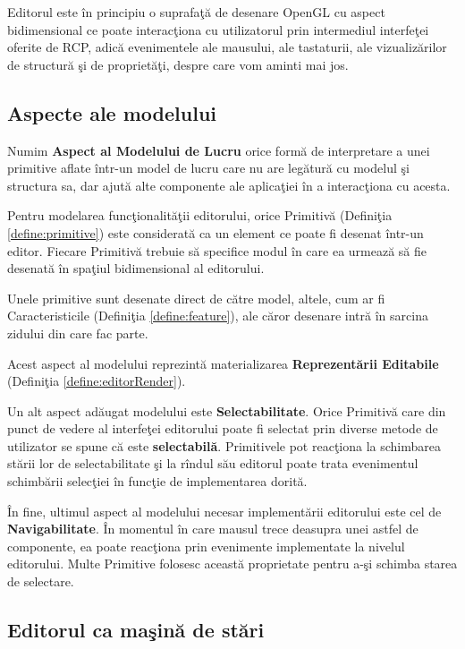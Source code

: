Editorul este în principiu o suprafaţă de desenare OpenGL cu aspect 
bidimensional ce poate interacţiona cu utilizatorul prin intermediul interfeţei 
oferite de RCP, adică evenimentele ale mausului, ale tastaturii, ale 
vizualizărilor de structură şi de proprietăţi, despre care vom aminti mai jos.

\subsection{Aspecte ale modelului}

\begin{definition}
\label{define:model-aspect}
Numim \textbf{Aspect al Modelului de Lucru} orice formă de interpretare a unei
primitive aflate într-un model de lucru care nu are legătură cu modelul şi
structura sa, dar ajută alte componente ale aplicaţiei în a interacţiona cu
acesta.
\end{definition}

Pentru modelarea funcţionalităţii editorului, orice Primitivă (Definiţia 
\ref{define:primitive}) este considerată ca un element ce poate fi desenat 
într-un editor. Fiecare Primitivă trebuie să specifice modul în care ea urmează 
să fie desenată în spaţiul bidimensional al editorului.

Unele primitive sunt desenate direct de către model, altele, cum ar fi 
Caracteristicile (Definiţia \ref{define:feature}), ale căror desenare intră în 
sarcina zidului din care fac parte.

Acest aspect al modelului reprezintă materializarea \textbf{Reprezentării 
Editabile} (Definiţia \ref{define:editorRender}).

Un alt aspect adăugat modelului este \textbf{Selectabilitate}. Orice Primitivă
care din punct de vedere al interfeţei editorului poate fi selectat prin diverse
metode de utilizator se spune că este \textbf{selectabilă}. Primitivele pot
reacţiona la schimbarea stării lor de selectabilitate şi la rîndul său editorul
poate trata evenimentul schimbării selecţiei în funcţie de implementarea dorită.

În fine, ultimul aspect al modelului necesar implementării editorului este cel
de \textbf{Navigabilitate}. În momentul în care mausul trece deasupra unei
astfel de componente, ea poate reacţiona prin evenimente implementate la nivelul
editorului. Multe Primitive folosesc această proprietate pentru a-şi schimba
starea de selectare.

\subsection{Editorul ca maşină de stări}

